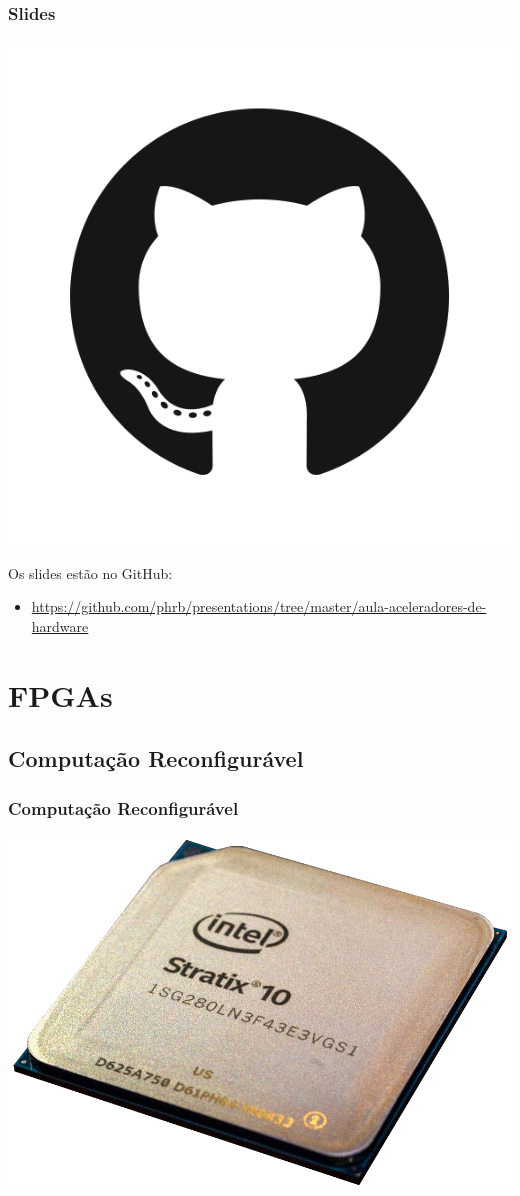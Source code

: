\documentclass[10pt, compress, aspectratio=169, xcolor={table,usenames,dvipsnames}]{beamer}
\begin{document}
\begin{frame}
    \frametitle{Slides}
    \begin{center}
        \includegraphics[width=.14\textwidth]{github}
    \end{center}
    Os slides estão no \alert{GitHub}:

    \begin{itemize}
        \item \url{https://github.com/phrb/presentations/tree/master/aula-aceleradores-de-hardware}
    \end{itemize}
\end{frame}

\section{FPGAs}

\subsection{Computação Reconfigurável}

\begin{frame}
    \frametitle{Computação Reconfigurável}
    \begin{center}
        \includegraphics[width=.48\textwidth]{stratix10}
    \end{center}
\end{frame}
\end{document}
